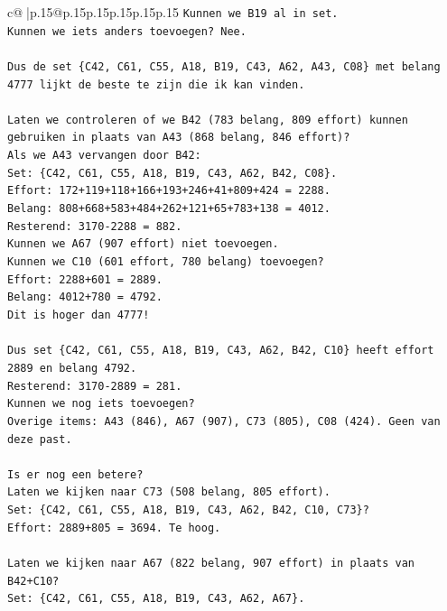 \documentclass{article}
\begin{document}
{\begin{supertabular}{c@{$\;$}|p{.15\linewidth}@{}p{.15\linewidth}p{.15\linewidth}p{.15\linewidth}p{.15\linewidth}p{.15\linewidth}}
{{{\texttt{Kunnen we B19 al in set.} \\
\texttt{Kunnen we iets anders toevoegen? Nee.} \\
\\ 
\texttt{Dus de set \{C42, C61, C55, A18, B19, C43, A62, A43, C08\} met belang 4777 lijkt de beste te zijn die ik kan vinden.} \\
\\ 
\texttt{Laten we controleren of we B42 (783 belang, 809 effort) kunnen gebruiken in plaats van A43 (868 belang, 846 effort)?} \\
\texttt{Als we A43 vervangen door B42:} \\
\texttt{Set: \{C42, C61, C55, A18, B19, C43, A62, B42, C08\}.} \\
\texttt{Effort: 172+119+118+166+193+246+41+809+424 = 2288.} \\
\texttt{Belang: 808+668+583+484+262+121+65+783+138 = 4012.} \\
\texttt{Resterend: 3170{-}2288 = 882.} \\
\texttt{Kunnen we A67 (907 effort) niet toevoegen.} \\
\texttt{Kunnen we C10 (601 effort, 780 belang) toevoegen?} \\
\texttt{Effort: 2288+601 = 2889.} \\
\texttt{Belang: 4012+780 = 4792.} \\
\texttt{Dit is hoger dan 4777!} \\
\\ 
\texttt{Dus set \{C42, C61, C55, A18, B19, C43, A62, B42, C10\} heeft effort 2889 en belang 4792.} \\
\texttt{Resterend: 3170{-}2889 = 281.} \\
\texttt{Kunnen we nog iets toevoegen?} \\
\texttt{Overige items: A43 (846), A67 (907), C73 (805), C08 (424). Geen van deze past.} \\
\\ 
\texttt{Is er nog een betere?} \\
\texttt{Laten we kijken naar C73 (508 belang, 805 effort).} \\
\texttt{Set: \{C42, C61, C55, A18, B19, C43, A62, B42, C10, C73\}?} \\
\texttt{Effort: 2889+805 = 3694. Te hoog.} \\
\\ 
\texttt{Laten we kijken naar A67 (822 belang, 907 effort) in plaats van B42+C10?} \\
\texttt{Set: \{C42, C61, C55, A18, B19, C43, A62, A67\}.} \\
}}}
\end{supertabular}}
\end{document}
